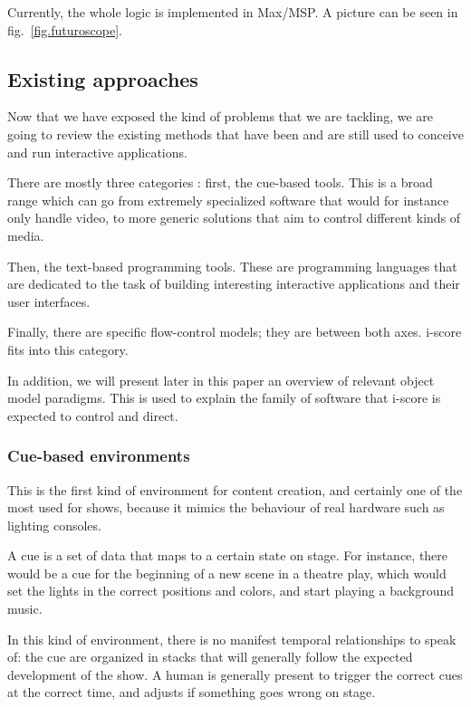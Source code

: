 \documentclass{sigchi}
\begin{document}
Currently, the whole logic is implemented in Max/MSP. A picture can be seen in fig.~\ref{fig.futuroscope}.


\subsection{Existing approaches}
Now that we have exposed the kind of problems that we are tackling, we are going to review the existing methods that have been and are still used to conceive and run interactive applications.

There are mostly three categories : first, the cue-based tools. This is a broad range which can go from extremely specialized software that would for instance only handle video, to more generic solutions that aim to control different kinds of media.

Then, the text-based programming tools. These are programming languages that are dedicated to the task of building interesting interactive applications and their user interfaces.

Finally, there are specific flow-control models; they are between both axes. i-score fits into this category.

In addition, we will present later in this paper an overview of relevant object model paradigms. This is used to explain the family of software that i-score is expected to control and direct. %

\subsubsection{Cue-based environments}
This is the first kind of environment for content creation, and certainly one of the most used for shows, because it mimics the behaviour of real hardware such as lighting consoles.

A cue is a set of data that maps to a certain state on stage. For instance, there would be a cue for the beginning of a new scene in a theatre play, which would set the lights in the correct positions and colors, and start playing a background music.

In this kind of environment, there is no manifest temporal relationships to speak of: the cue are organized in stacks that will generally follow the expected development of the show. A human is generally present to trigger the correct cues at the correct time, and adjusts if something goes wrong on stage.
\end{document}

